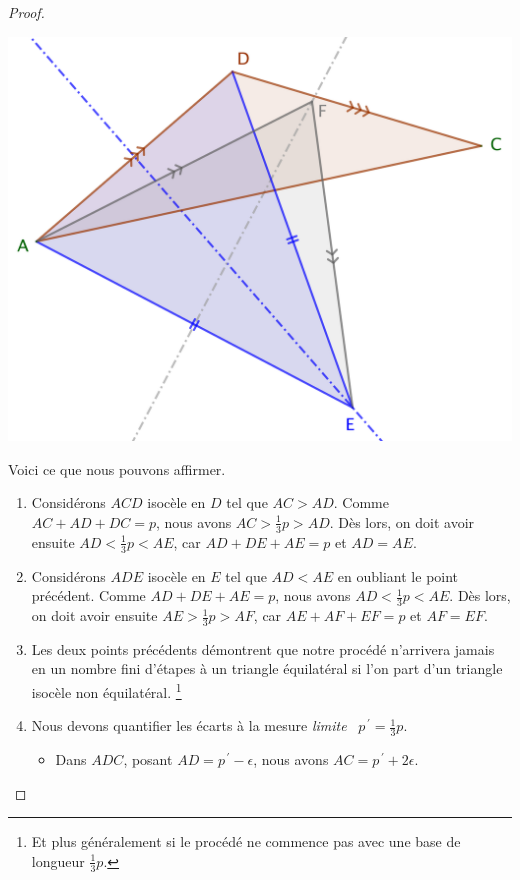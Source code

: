 \begin{proof}
	\begin{center}
		\includegraphics[scale=.4]{content/triangle-gene/triangle-proof.png}
	\end{center} 
	
	
	Voici ce que nous pouvons affirmer.
	\begin{enumerate}
		\item Considérons $ACD$ isocèle en $D$ tel que $AC > AD$.
		Comme $AC + AD + DC = p$, nous avons $AC > \frac13p > AD$.
		Dès lors, on doit avoir ensuite  $AD < \frac13p < AE$, car $AD + DE + AE = p$ et $AD = AE$.


		\item Considérons $ADE$ isocèle en $E$ tel que $AD < AE$ en oubliant le point précédent.
		Comme $AD + DE + AE = p$, nous avons $AD < \frac13p < AE$.
		Dès lors, on doit avoir ensuite  $AE > \frac13p > AF$, car $AE + AF + EF = p$ et $AF = EF$.


		\item Les deux points précédents démontrent que notre procédé n'arrivera jamais en un nombre fini d'étapes à un triangle équilatéral si l'on part d'un triangle isocèle non équilatéral.%
		\footnote{
			Et plus généralement si le procédé ne commence pas avec une base de longueur $\frac13 p$.
		}


		\item Nous devons quantifier les écarts à la mesure \og \emph{limite} \fg\ $p^{\,\prime} = \frac13 p$. 
		\begin{itemize}
			\item Dans $ADC$, posant $AD = p^{\,\prime} - \epsilon$, nous avons $AC = p^{\,\prime} + 2 \epsilon$.


\end{itemize}
\end{enumerate}
\end{proof}
